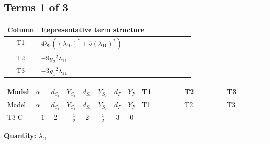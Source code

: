 \documentclass[8pt]{article}
\begin{document}
\begin{landscape}
\subsection*{Terms 1 of 3}
\begin{center}
\begin{tabular}{@{}c >{\raggedright\arraybackslash}p{0.82\linewidth}@{}}
\toprule
Column & Representative term structure \\
\midrule
T1 & \(\displaystyle 4 {\lambda_{9}} (\left({\lambda_{10}}\right)^{*}+5 \left({\lambda_{11}}\right)^{*})\) \\
\midrule
T2 & \(\displaystyle -9 {g_2}^2 {\lambda_{11}}\) \\
\midrule
T3 & \(\displaystyle -3 {g_1}^2 {\lambda_{11}}\) \\
\midrule
\bottomrule
\end{tabular}
\end{center}
\smallskip
\tiny
\begin{longtable}{@{}llcccccc >{\raggedright\arraybackslash}p{0.21\linewidth} >{\raggedright\arraybackslash}p{0.21\linewidth} >{\raggedright\arraybackslash}p{0.21\linewidth}@{}}
\toprule
Model & $\alpha$ & $d_{S_1}$ & $Y_{S_1}$ & $d_{S_2}$ & $Y_{S_2}$ & $d_F$ & $Y_F$ & T1 & T2 & T3 \\
\midrule
\endfirsthead
\toprule
Model & $\alpha$ & $d_{S_1}$ & $Y_{S_1}$ & $d_{S_2}$ & $Y_{S_2}$ & $d_F$ & $Y_F$ & T1 & T2 & T3 \\
\midrule
\endhead
T3-C & $-1$ & $2$ & $-\frac{1}{2}$ & $2$ & $\frac{1}{2}$ & $3$ & $0$ & \scriptsize\adjustbox{max width=\linewidth}{$\begin{gathered} 4 {\lambda_{9}} (\left({\lambda_{10}}\right)^{*}+5 \left({\lambda_{11}}\right)^{*})\end{gathered}$} & \scriptsize\adjustbox{max width=\linewidth}{$\begin{gathered} -9 {g_2}^2 {\lambda_{11}}\end{gathered}$} & \scriptsize\adjustbox{max width=\linewidth}{$\begin{gathered} -3 {g_1}^2 {\lambda_{11}}\end{gathered}$} \\
\midrule
\bottomrule
\end{longtable}
\clearpage
\noindent\textbf{Quantity: }$\lambda_{11}$\par\smallskip

\end{landscape}
\end{document}

